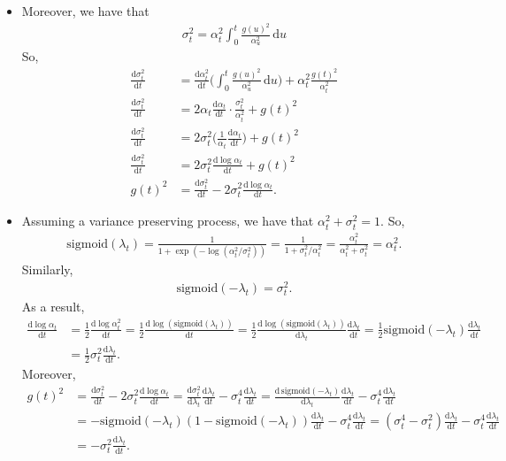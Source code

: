 \documentclass[10pt]{article}
\newcommand{\dee}{\mathrm{d}}
\newcommand{\mrm}[1]{\mathrm{#1}}
\begin{document}
\begin{itemize}
  \item Moreover, we have that
  \begin{align*}
    \sigma_t^2 = \alpha_t^2 \int_0^t \frac{g(u)^2}{\alpha_u^2}\, \dee u
  \end{align*}
  So,
  \begin{align*}
    \frac{\dee \sigma_t^2}{\dee t}  &= \frac{\dee \alpha_t^2}{\dee t} \bigg( \int_0^t \frac{g(u)^2}{\alpha_u^2}\, \dee u\bigg) + \alpha_t^2 \frac{g(t)^2}{\alpha_t^2} \\
    \frac{\dee \sigma_t^2}{\dee t}  &= 2 \alpha_t \frac{\dee \alpha_t}{\dee t} \cdot \frac{\sigma_t^2}{\alpha_t^2} + g(t)^2 \\    
    \frac{\dee \sigma_t^2}{\dee t}  &= 2 \sigma_t^2 \bigg( \frac{1}{\alpha_t} \frac{\dee \alpha_t}{\dee t} \bigg) + g(t)^2 \\    
    \frac{\dee \sigma_t^2}{\dee t}  &= 2 \sigma_t^2 \frac{\dee \log \alpha_t}{\dee t} + g(t)^2 \\    
    g(t)^2 &= \frac{\dee \sigma_t^2}{\dee t} - 2 \sigma_t^2 \frac{\dee \log \alpha_t}{\dee t}.
  \end{align*}

  \item Assuming a variance preserving process, we have that $\alpha_t^2 + \sigma_t^2 = 1$. So,
  \begin{align*}
    \mrm{sigmoid}(\lambda_t) = \frac{1}{1 + \exp(-\log(\alpha_t^2/\sigma_t^2))} = \frac{1}{1 + \sigma_t^2/\alpha_t^2} = \frac{\alpha_t^2}{\alpha_t^2 + \sigma_t^2} = \alpha_t^2.
  \end{align*}
  Similarly,
  \begin{align*}
    \mrm{sigmoid}(-\lambda_t) = \sigma_t^2.
  \end{align*}
  As a result,
  \begin{align*}
    \frac{\dee \log \alpha_t}{\dee t} 
    &= \frac{1}{2} \frac{\dee \log \alpha_t^2}{\dee t}
    = \frac{1}{2} \frac{\dee \log (\mrm{sigmoid}(\lambda_t))}{\dee t}
    = \frac{1}{2} \frac{\dee \log (\mrm{sigmoid}(\lambda_t))}{\dee \lambda_t} \frac{\dee\lambda_t}{\dee t} 
    = \frac{1}{2} \mrm{sigmoid}(-\lambda_t) \frac{\dee\lambda_t}{\dee t} \\
    &= \frac{1}{2} \sigma_t^2 \frac{\dee\lambda_t}{\dee t}.
  \end{align*}
  Moreover,
  \begin{align*}
    g(t)^2 
    &= \frac{\dee \sigma_t^2}{\dee t} - 2 \sigma_t^2 \frac{\dee \log \alpha_t}{\dee t}
    = \frac{\dee \sigma_t^2}{\dee \lambda_t} \frac{\dee \lambda_t}{\dee t} - \sigma_t^4 \frac{\dee \lambda_t}{\dee t}
    = \frac{\dee\, \mrm{sigmoid}(-\lambda_t)}{\dee \lambda_t} \frac{\dee \lambda_t}{\dee t} - \sigma_t^4 \frac{\dee \lambda_t}{\dee t} \\
    &= -\mrm{sigmoid}(-\lambda_t)(1 - \mrm{sigmoid}(-\lambda_t)) \frac{\dee \lambda_t}{\dee t} - \sigma_t^4 \frac{\dee \lambda_t}{\dee t} 
    = (\sigma_t^4 - \sigma_t^2)\frac{\dee \lambda_t}{\dee t} - \sigma_t^4 \frac{\dee \lambda_t}{\dee t} \\
    &= -\sigma_t^2 \frac{\dee \lambda_t}{\dee t}.
  \end{align*}


\end{itemize}
\end{document}
